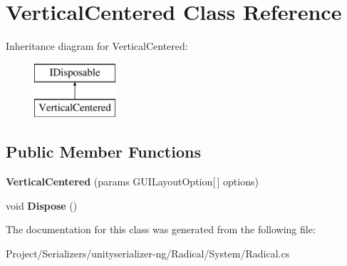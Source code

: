 \hypertarget{class_vertical_centered}{}\section{Vertical\+Centered Class Reference}
\label{class_vertical_centered}
Inheritance diagram for Vertical\+Centered\+:\begin{figure}[H]
\begin{center}
\leavevmode
\includegraphics[height=2.000000cm]{class_vertical_centered}
\end{center}
\end{figure}
\subsection*{Public Member Functions}
\begin{DoxyCompactItemize}
\item 
\mbox{\label{class_vertical_centered_abe07e0a533721ac8d5675297eeec1a28}} 
{\bfseries Vertical\+Centered} (params G\+U\+I\+Layout\+Option\mbox{[}$\,$\mbox{]} options)
\item 
\mbox{\label{class_vertical_centered_a705b958f5fe1f45e3aca234daa1be378}} 
void {\bfseries Dispose} ()
\end{DoxyCompactItemize}


The documentation for this class was generated from the following file\+:\begin{DoxyCompactItemize}
\item 
Project/\+Serializers/unityserializer-\/ng/\+Radical/\+System/Radical.\+cs\end{DoxyCompactItemize}
